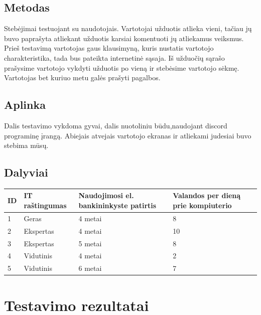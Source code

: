 \documentclass[oneside]{VUMIFPSkursinis}
\begin{document}
\subsection{Metodas}
Stebėjimai testuojant su naudotojais. Vartotojai užduotis atlieka vieni, tačiau jų buvo paprašyta atliekant užduotis karsiai komentuoti jų atliekamus veiksmus. Prieš testavimą vartotojas gaus klausimyną, kuris nustatis vartotojo charakteristika, tada bus pateikta internetinė sąsaja. Iš užduočių sąrašo prašysime vartotojo vykdyti užduotis po vieną ir stebėsime vartotojo sėkmę. Vartotojas bet kuriuo metu galės prašyti pagalbos. 
\subsection{Aplinka}
Dalis testavimo vykdoma gyvai, dalis nuotoliniu būdu,naudojant discord programinę įrangą. Abiejais atvejais vartotojo ekranas ir atliekami judesiai buvo stebima mūsų.
\subsection{Dalyviai}
\begin{center}
	\begin{tabular}{ |p{1cm} | p{3cm} | p{5cm} | p{5cm} |}
	\hline
ID&IT raštingumas & Naudojimosi el. bankininkyste patirtis & Valandos per dieną prie kompiuterio\\ \hline
1&Geras&4 metai&8 \\ \hline
2&Ekspertas&4 metai&10 \\ \hline
3&Ekspertas&5 metai&8 \\ \hline
4&Vidutinis&4 metai&2 \\ \hline
5&Vidutinis&6 metai&7 \\ \hline
\end{tabular}
\end{center}

\section{Testavimo rezultatai}
\end{document}
